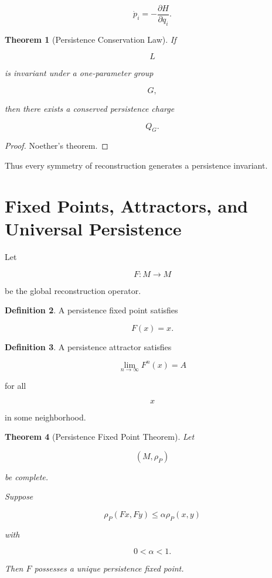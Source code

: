 \documentclass[12pt,oneside]{article}
\newtheorem{theorem}{Theorem}[section] \newtheorem{lemma}[theorem]{Lemma} \newtheorem{proposition}[theorem]{Proposition} \newtheorem{corollary}[theorem]{Corollary}
\theoremstyle{definition}
\newtheorem{definition}[theorem]{Definition} \newtheorem{axiom}[theorem]{Axiom} \newtheorem{remark}[theorem]{Remark} \newtheorem{example}[theorem]{Example}
\begin{document}
\[
\dot p_i
=
-
\frac{\partial H}{\partial q_i}.
\]

\begin{theorem}[Persistence Conservation Law]

If

\[
L
\]

is invariant under a one-parameter group

\[
G,
\]

then there exists a conserved persistence charge

\[
Q_G.
\]

\end{theorem}

\begin{proof}

Noether's theorem.

\end{proof}

Thus every symmetry of reconstruction generates a persistence invariant.

\section{Fixed Points, Attractors, and Universal Persistence}

Let

\[
F:M\to M
\]

be the global reconstruction operator.

\begin{definition}

A persistence fixed point satisfies

\[
F(x)=x.
\]

\end{definition}

\begin{definition}

A persistence attractor satisfies

\[
\lim_{n\to\infty}
F^n(x)
=
A
\]

for all

\[
x
\]

in some neighborhood.

\end{definition}

\begin{theorem}[Persistence Fixed Point Theorem]

Let

\[
(M,\rho_P)
\]

be complete.

Suppose

\[
\rho_P(Fx,Fy)
\le
\alpha
\rho_P(x,y)
\]

with

\[
0<\alpha<1.
\]

Then \(F\) possesses a unique persistence fixed point.

\end{theorem}
\end{document}
